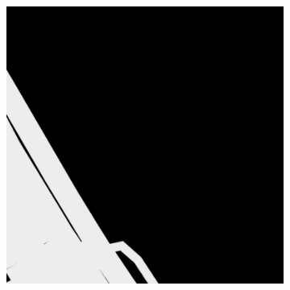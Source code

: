 \documentclass[10pt,conference,compsocconf]{IEEEtran}
\begin{document}
\begin{figure}
\begin{subfigure}[b]{0.3\columnwidth}
    \end{subfigure}
    \begin{subfigure}[b]{0.3\columnwidth}
      \includegraphics[width=\columnwidth]{figures/training_hard/gt_004.png}
    \end{subfigure}


\end{figure}
\end{document}
